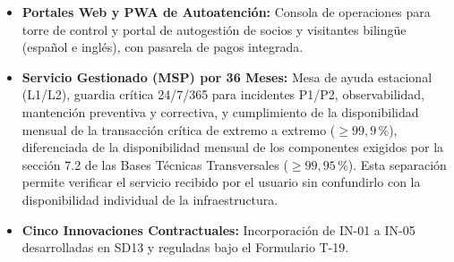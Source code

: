 \begin{itemize}
    \item \textbf{Portales Web y PWA de Autoatención:} Consola de operaciones para torre de control y portal de autogestión de socios y visitantes bilingüe (español e inglés), con pasarela de pagos integrada.
    \item \textbf{Servicio Gestionado (MSP) por 36 Meses:} Mesa de ayuda estacional (L1/L2), guardia crítica 24/7/365 para incidentes P1/P2, observabilidad, mantención preventiva y correctiva, y cumplimiento de la disponibilidad mensual de la transacción crítica de extremo a extremo ($\ge 99,9\,\%$), diferenciada de la disponibilidad mensual de los componentes exigidos por la sección 7.2 de las Bases Técnicas Transversales ($\ge 99,95\,\%$). Esta separación permite verificar el servicio recibido por el usuario sin confundirlo con la disponibilidad individual de la infraestructura.
    \item \textbf{Cinco Innovaciones Contractuales:} Incorporación de IN-01 a IN-05 desarrolladas en SD13 y reguladas bajo el Formulario T-19.
\end{itemize}

